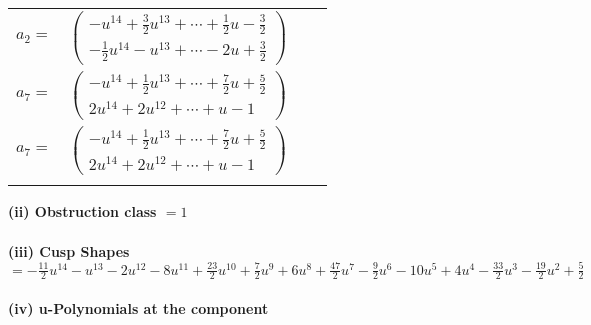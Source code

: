 \documentclass[1p]{elsarticle_modified}
\theoremstyle{definition}
\begin{document}
\begin{tabular}{m{7pt} m{180pt} m{7pt} m{180pt} }
\flushright $a_{2}=$&$\begin{pmatrix}- u^{14}+\frac{3}{2} u^{13}+\cdots+\frac{1}{2} u-\frac{3}{2}\\-\frac{1}{2} u^{14}- u^{13}+\cdots-2 u+\frac{3}{2}\end{pmatrix}$ \\
\flushright $a_{7}=$&$\begin{pmatrix}- u^{14}+\frac{1}{2} u^{13}+\cdots+\frac{7}{2} u+\frac{5}{2}\\2 u^{14}+2 u^{12}+\cdots+u-1\end{pmatrix}$\\ \flushright $a_{7}=$&$\begin{pmatrix}- u^{14}+\frac{1}{2} u^{13}+\cdots+\frac{7}{2} u+\frac{5}{2}\\2 u^{14}+2 u^{12}+\cdots+u-1\end{pmatrix}$\\&\end{tabular}
\flushleft \textbf{(ii) Obstruction class $= 1$}\\~\\
\flushleft \textbf{(iii) Cusp Shapes $= -\frac{11}{2} u^{14}- u^{13}-2 u^{12}-8 u^{11}+\frac{23}{2} u^{10}+\frac{7}{2} u^9+6 u^8+\frac{47}{2} u^7-\frac{9}{2} u^6-10 u^5+4 u^4-\frac{33}{2} u^3-\frac{19}{2} u^2+\frac{5}{2}$}\\~\\
\newpage\renewcommand{\arraystretch}{1}
\flushleft \textbf{(iv) u-Polynomials at the component}\newline \\
\end{document}
